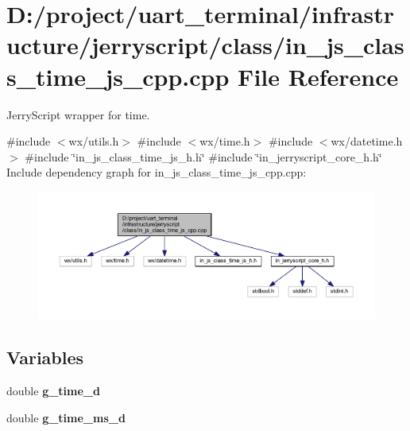 \section{D\+:/project/uart\+\_\+terminal/infrastructure/jerryscript/class/in\+\_\+js\+\_\+class\+\_\+time\+\_\+js\+\_\+cpp.cpp File Reference}
\label{in__js__class__time__js__cpp_8cpp}


Jerry\+Script wrapper for time.  


{\ttfamily \#include $<$wx/utils.\+h$>$}\newline
{\ttfamily \#include $<$wx/time.\+h$>$}\newline
{\ttfamily \#include $<$wx/datetime.\+h$>$}\newline
{\ttfamily \#include \char`\"{}in\+\_\+js\+\_\+class\+\_\+time\+\_\+js\+\_\+h.\+h\char`\"{}}\newline
{\ttfamily \#include \char`\"{}in\+\_\+jerryscript\+\_\+core\+\_\+h.\+h\char`\"{}}\newline
Include dependency graph for in\+\_\+js\+\_\+class\+\_\+time\+\_\+js\+\_\+cpp.\+cpp\+:
\nopagebreak
\begin{figure}[H]
\begin{center}
\leavevmode
\includegraphics[width=350pt]{in__js__class__time__js__cpp_8cpp__incl}
\end{center}
\end{figure}
\subsection*{Variables}
\begin{DoxyCompactItemize}
\item 
double \textbf{ g\+\_\+time\+\_\+d}
\item 
double {\bfseries g\+\_\+time\+\_\+ms\+\_\+d}
\end{DoxyCompactItemize}


